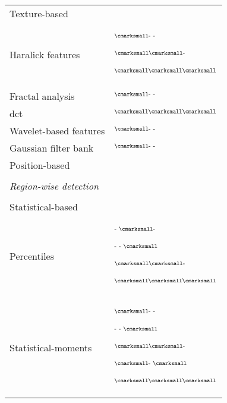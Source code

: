 \begin{table}
\begin{threeparttable}
\begin{tabular}{p{.5\linewidth} p{.4\linewidth}}
      \quad \quad Texture-based & \\
      \quad \quad \quad Haralick features & $^{\text{{\cmarksmall}- -}}$\cite{Antic2013,Tiwari2009a,Tiwari2010,Tiwari2013,Viswanath2008,Viswanath2009,Viswanath2012}\par $^{\text{{\cmarksmall}{\cmarksmall}-}}$\cite{Viswanath2011}\par $^{\text{{\cmarksmall}{\cmarksmall}{\cmarksmall}}}$\cite{Litjens2012,Niaf2011,Niaf2012} \\
      \quad \quad \quad Fractal analysis & $^{\text{{\cmarksmall}- -}}$\cite{Lopes2011,Lv2009} \\
      \quad \quad \quad \Ac{dct} & $^{\text{{\cmarksmall}{\cmarksmall}{\cmarksmall}}}$\cite{Chan2003} \\
      \quad \quad \quad Wavelet-based features & $^{\text{{\cmarksmall}- -}}$\cite{Viswanath2012} \\
      \quad \quad \quad Gaussian filter bank & $^{\text{{\cmarksmall}- -}}$\cite{Litjens2014} \\ 
      \quad \quad Position-based & \cite{Chan2003,Litjens2011,Litjens2012,Litjens2014} \\ \\ [-1.5ex]
      \quad \textit{Region-wise detection} &  \\ \\ [-1.5ex]
      \quad \quad Statistical-based & \\
      \quad \quad \quad Percentiles & $^{\text{- {\cmarksmall}-}}$\cite{Vos2008a} \par $^{\text{- - {\cmarksmall}}}$\cite{Antic2013,Peng2013}\par $^{\text{{\cmarksmall}{\cmarksmall}-}}$\cite{Vos2010}\par $^{\text{{\cmarksmall}{\cmarksmall}{\cmarksmall}}}$\cite{Litjens2011,Litjens2012,Litjens2014,Niaf2011,Niaf2012,Vos2012} \\
      \quad \quad \quad Statistical-moments & $^{\text{{\cmarksmall}- -}}$\cite{Ampeliotis2007,Ampeliotis2008,Tiwari2009a,Tiwari2010,Tiwari2013,Viswanath2008,Viswanath2009,Viswanath2012}\par $^{\text{- - {\cmarksmall}}}$\cite{Antic2013}\par $^{\text{{\cmarksmall}{\cmarksmall}-}}$\cite{Viswanath2011}\par $^{\text{{\cmarksmall}- {\cmarksmall}}}$\cite{Peng2013}\par $^{\text{{\cmarksmall}{\cmarksmall}{\cmarksmall}}}$\cite{Litjens2011,Litjens2012,Litjens2014,Niaf2011,Niaf2012} \\

\end{tabular}
\end{threeparttable}
\end{table}
